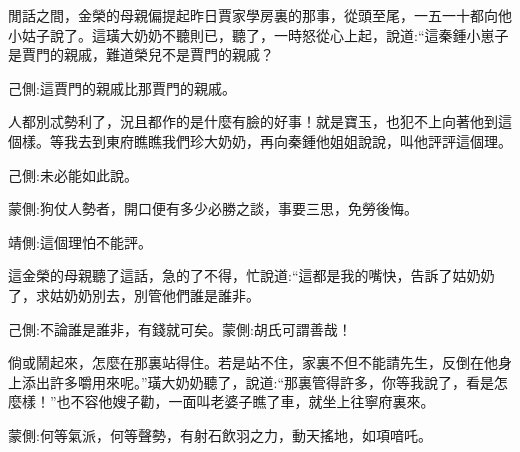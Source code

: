 \begin{parag}
    閒話之間，金榮的母親偏提起昨日賈家學房裏的那事，從頭至尾，一五一十都向他小姑子說了。這璜大奶奶不聽則已，聽了，一時怒從心上起，說道:“這秦鍾小崽子是賈門的親戚，難道榮兒不是賈門的親戚？\begin{note}己側:這賈門的親戚比那賈門的親戚。\end{note}人都別忒勢利了，況且都作的是什麼有臉的好事！就是寶玉，也犯不上向著他到這個樣。等我去到東府瞧瞧我們珍大奶奶，再向秦鍾他姐姐說說，叫他評評這個理。\begin{note}己側:未必能如此說。\end{note}\begin{note}蒙側:狗仗人勢者，開口便有多少必勝之談，事要三思，免勞後悔。\end{note}\begin{note}靖側:這個理怕不能評。\end{note}這金榮的母親聽了這話，急的了不得，忙說道:“這都是我的嘴快，告訴了姑奶奶了，求姑奶奶別去，別管他們誰是誰非。\begin{note}己側:不論誰是誰非，有錢就可矣。蒙側:胡氏可謂善哉！\end{note}倘或鬧起來，怎麼在那裏站得住。若是站不住，家裏不但不能請先生，反倒在他身上添出許多嚼用來呢。”璜大奶奶聽了，說道:“那裏管得許多，你等我說了，看是怎麼樣！”也不容他嫂子勸，一面叫老婆子瞧了車，就坐上往寧府裏來。\begin{note}蒙側:何等氣派，何等聲勢，有射石飲羽之力，動天搖地，如項喑吒。\end{note}
\end{parag}


